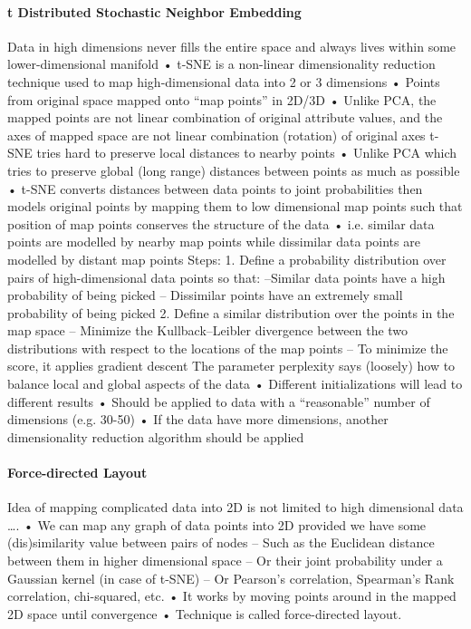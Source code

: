 \paragraph*{t Distributed Stochastic Neighbor Embedding}
Data in high dimensions never fills
the entire space and always lives
within some lower-dimensional manifold
• t-SNE is a non-linear dimensionality
reduction technique used to map
high-dimensional data into
2 or 3 dimensions
• Points from original space mapped onto “map points” in 2D/3D
• Unlike PCA, the mapped points are not linear combination of original attribute values, and the axes of
mapped space are not linear combination (rotation) of original axes
t-SNE tries hard to preserve local distances to nearby points
• Unlike PCA which tries to preserve global (long range) distances between points as much as
possible
• t-SNE converts distances between data points to joint probabilities then models original points
by mapping them to low dimensional map points such that position of map points conserves
the structure of the data
• i.e. similar data points are modelled by nearby map points while dissimilar data points are
modelled by distant map points
Steps: 1. Define a probability distribution over pairs of high-dimensional data points so that:
–Similar data points have a high probability of being picked
– Dissimilar points have an extremely small probability of being picked
2. Define a similar distribution over the points in the map space
– Minimize the Kullback–Leibler divergence between the two distributions with respect to the
locations of the map points
– To minimize the score, it applies gradient descent
The parameter perplexity says (loosely) how to balance local and global aspects of the data
• Different initializations will lead to different results
• Should be applied to data with a “reasonable” number of dimensions (e.g. 30-50)
• If the data have more dimensions, another dimensionality reduction algorithm should be applied

\paragraph*{Force-directed Layout}
Idea of mapping complicated data into 2D is not limited to high dimensional data ….
• We can map any graph of data points into 2D provided we have some (dis)similarity
value between pairs of nodes
– Such as the Euclidean distance between them in higher dimensional space
– Or their joint probability under a Gaussian kernel (in case of t-SNE)
– Or Pearson’s correlation, Spearman’s Rank correlation, chi-squared, etc.
• It works by moving points around in the mapped 2D space until convergence
• Technique is called force-directed layout. 